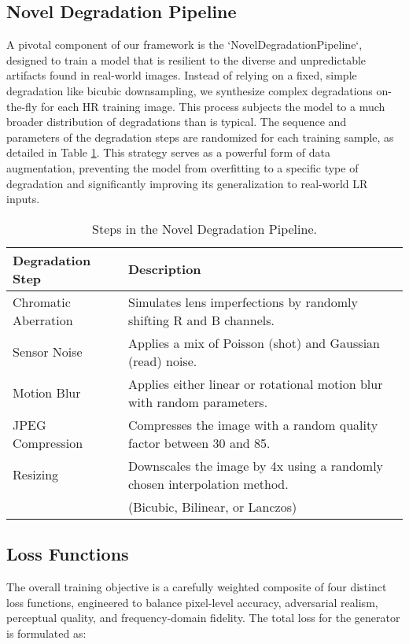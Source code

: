 \documentclass{article}
\begin{document}
\subsection{Novel Degradation Pipeline}
A pivotal component of our framework is the `NovelDegradationPipeline`, designed to train a model that is resilient to the diverse and unpredictable artifacts found in real-world images. Instead of relying on a fixed, simple degradation like bicubic downsampling, we synthesize complex degradations on-the-fly for each HR training image. This process subjects the model to a much broader distribution of degradations than is typical. The sequence and parameters of the degradation steps are randomized for each training sample, as detailed in Table \ref{tab:degradation_pipeline}. This strategy serves as a powerful form of data augmentation, preventing the model from overfitting to a specific type of degradation and significantly improving its generalization to real-world LR inputs.

\begin{table}[h!]
\centering
\caption{Steps in the Novel Degradation Pipeline.}
\label{tab:degradation_pipeline}
\begin{tabular}{@{}ll@{}}
\toprule
Degradation Step          & Description                                                               \\ \midrule
Chromatic Aberration      & Simulates lens imperfections by randomly shifting R and B channels.       \\
Sensor Noise              & Applies a mix of Poisson (shot) and Gaussian (read) noise.                \\
Motion Blur               & Applies either linear or rotational motion blur with random parameters.   \\
JPEG Compression          & Compresses the image with a random quality factor between 30 and 85.      \\
Resizing                  & Downscales the image by 4x using a randomly chosen interpolation method.  \\
                          & (Bicubic, Bilinear, or Lanczos)                                           \\ \bottomrule
\end{tabular}
\end{table}

\subsection{Loss Functions}
The overall training objective is a carefully weighted composite of four distinct loss functions, engineered to balance pixel-level accuracy, adversarial realism, perceptual quality, and frequency-domain fidelity. The total loss for the generator is formulated as:
\end{document}
